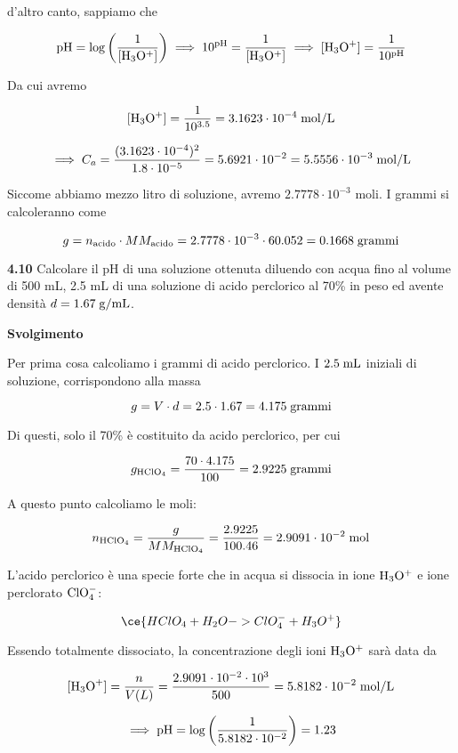 d'altro canto, sappiamo che

$$\rm pH=\log{\left(\frac{1}{[H_3O^+]}\right)}
\implies
10^{pH}=\frac{1}{[H_3O^+]}
\implies
[H_3O^+]=\frac{1}{10^{pH}}$$

Da cui avremo

$$\rm [H_3O^+]=\frac{1}{10^{3.5}}=3.1623 \cdot 10^{-4} \; \rm mol/L$$

$$\implies
C_a=\frac{(3.1623 \cdot 10^{-4})^2}{1.8 \cdot 10^{-5}}=5.6921 \cdot 10^{-2}
=5.5556 \cdot 10^{-3} \; \rm mol/L$$

Siccome abbiamo mezzo litro di soluzione, avremo $2.7778 \cdot 10^{-3}$ moli. I grammi si calcoleranno come

$$g=n_{\text{acido}} \cdot MM_{\text{acido}}
=2.7778 \cdot 10^{-3} \cdot 60.052=0.1668 \; \rm grammi$$

\vspace{0.2cm}\textbf{4.10} Calcolare il pH di una soluzione ottenuta diluendo con acqua fino al volume di 500 mL, 2.5 mL
di una soluzione di acido perclorico al 70\% in peso ed avente densità $d=1.67 \; \rm g/mL$.

\vspace{0.2cm}\large\textbf{Svolgimento}\normalsize

\vspace{0.2cm}Per prima cosa calcoliamo i grammi di acido perclorico. I $2.5 \; \rm mL$ iniziali di soluzione, corrispondono alla massa

$$g=V \cdot d=2.5 \cdot 1.67=4.175 \; \rm grammi$$

Di questi, solo il 70\% è costituito da acido perclorico, per cui

$$g_{\rm HClO_4}
=\frac{70 \cdot 4.175}{100}
=2.9225 \; \rm grammi$$

A questo punto calcoliamo le moli:

$$n_{\rm HClO_4}
=\frac{g}{MM_{\rm HClO_4}}
=\frac{2.9225}{100.46}=2.9091 \cdot 10^{-2} \; \rm mol$$

L'acido perclorico è una specie forte che in acqua si dissocia in ione $\rm H_3O^+$ e ione perclorato $\rm ClO_4^-$:

$$\ce{HClO_4 + H_2O -> ClO_4^- + H_3O^+}$$

Essendo totalmente dissociato, la concentrazione degli ioni $\rm H_3O^+$ sarà data da

$$[\text{H}_3\text{O}^+]=\frac{n}{V(L)}=\frac{2.9091 \cdot 10^{-2} \cdot 10^{3}}{500}=5.8182 \cdot 10^{-2} \; \rm mol/L$$

$$\implies \rm pH=\log{\left( \frac{1}{5.8182 \cdot 10^{-2}} \right)}=1.23$$

